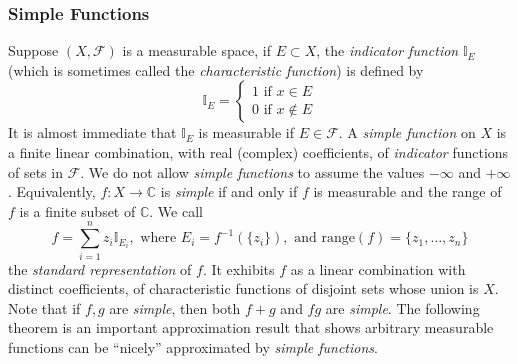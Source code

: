 \documentclass{article}
\begin{document}
\subsubsection{Simple Functions}
Suppose $(X,\mathcal{F})$ is a measurable space, if $E\subset X$, the \emph{indicator function} $\mathbb{I}_E$ (which is sometimes called the \emph{characteristic function}) is defined by 
\[
\mathbb{I}_E=\begin{cases}
    1 \text{ if } x \in E \\ 0 \text{ if } x \notin E
    \end{cases}
\]
It is almost immediate that $\mathbb{I}_E$ is measurable if $E\in\mathcal{F}$. A \emph{simple function} on $X$ is a finite linear combination, with real (complex) coefficients, of \emph{indicator} functions of sets in $\mathcal{F}$. We do not allow \emph{simple functions} to assume the values $-\infty$ and $+\infty$. Equivalently, $f:X\to\mathbb{C}$ is \emph{simple} if and only if $f$ is measurable and the range of $f$ is a finite subset of $\mathbb{C}$. We call \[
f= \sum_{i=1}^nz_i\mathbb{I}_{E_i}, \text{ where } E_i= f^{-1}(\{z_i\}), \text{ and } \text{range}(f)=\{z_1,\ldots,z_n\}
\] 
the \emph{standard representation} of $f$. It exhibits $f$ as a linear combination with distinct coefficients, of characteristic functions of disjoint sets whose union is $X$. Note that if $f,g$ are \emph{simple}, then both $f+g$ and $fg$ are \emph{simple}. \newline \newline 
The following theorem is an important approximation result that shows arbitrary measurable functions can be ``nicely'' approximated by \emph{simple functions}.
\end{document}
